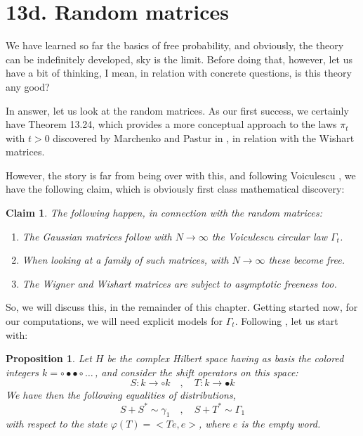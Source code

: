 \documentclass[12pt]{amsbook}
\newtheorem{claim}[theorem]{Claim}
\newtheorem{proposition}[theorem]{Proposition}
\begin{document}
\section*{13d. Random matrices}

We have learned so far the basics of free probability, and obviously, the theory can be indefinitely developed, sky is the limit. Before doing that, however, let us have a bit of thinking, I mean, in relation with concrete questions, is this theory any good?

\bigskip

In answer, let us look at the random matrices. As our first success, we certainly have Theorem 13.24, which provides a more conceptual approach to the laws $\pi_t$ with $t>0$ discovered by Marchenko and Pastur in \cite{mpa}, in relation with the Wishart matrices.

\bigskip

However, the story is far from being over with this, and following Voiculescu \cite{vo3}, we have the following claim, which is obviously first class mathematical discovery:

\begin{claim}
The following happen, in connection with the random matrices:
\begin{enumerate}
\item The Gaussian matrices follow with $N\to\infty$ the Voiculescu circular law $\Gamma_t$.

\item When looking at a family of such matrices, with $N\to\infty$ these become free.

\item The Wigner and Wishart matrices are subject to asymptotic freeness too.
\end{enumerate}
\end{claim}

So, we will discuss this, in the remainder of this chapter. Getting started now, for our computations, we will need explicit models for $\Gamma_t$. Following \cite{vo1}, let us start with:


\begin{proposition}
Let $H$ be the complex Hilbert space having as basis the colored integers $k=\circ\bullet\bullet\circ\ldots$\,, and consider the shift operators on this space: 
$$S:k\to\circ k\quad,\quad 
T:k\to\bullet k$$
We have then the following equalities of distributions,
$$S+S^*\sim\gamma_1\quad,\quad 
S+T^*\sim\Gamma_1$$
with respect to the state $\varphi(T)=<Te,e>$, where $e$ is the empty word.
\end{proposition}
\end{document}
